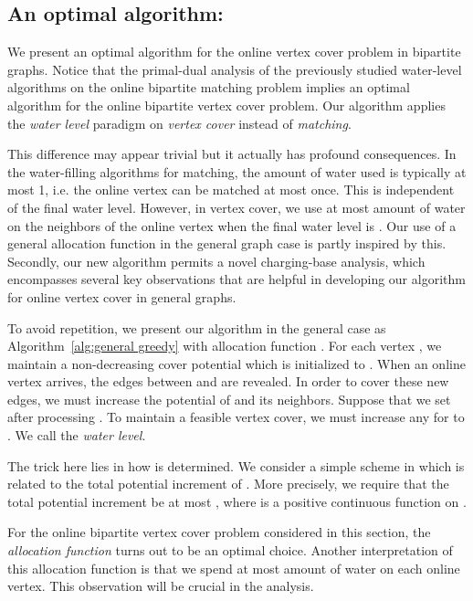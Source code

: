 \documentclass{article}
\begin{document}
\subsection{An optimal algorithm: }
\label{subsec:greedyallocation}
We present an optimal algorithm for the online vertex cover problem in bipartite graphs.  Notice that the primal-dual analysis of the previously studied water-level algorithms on the online bipartite matching problem implies an optimal algorithm for the online bipartite vertex cover problem. Our algorithm applies the {\em water level} paradigm on {\em vertex cover} instead of {\em matching}. 

This difference may appear trivial but it actually has profound consequences. In the water-filling algorithms for matching, the amount of water used is typically at most 1, i.e. the online vertex can be matched at most once. This is independent of the final water level. However, in vertex cover, we use at most  amount of water on the neighbors of the online vertex when the final water level is . Our use of a general allocation function  in the general graph case is partly inspired by this. Secondly, our new algorithm permits a novel charging-base analysis, 
which encompasses several key observations that are helpful in developing our algorithm for online vertex cover in general graphs.

To avoid repetition, we present our algorithm in the general case as Algorithm~\ref{alg:general greedy} with allocation function . For each vertex , we maintain a non-decreasing cover potential  which is initialized to .
When an online vertex  arrives, the edges between  and  are revealed. In order to cover these new edges, we must increase the potential of  and its neighbors. Suppose that we set  after processing . To maintain a feasible vertex cover, we must increase any  for  to . We call  the {\em water level}.

The trick here lies in how  is determined. We consider a simple scheme in which  is related to the total potential increment of . More precisely, we require that the total potential increment  be at most , where  is a positive continuous function on . 

For the online bipartite vertex cover problem considered in this section, the {\em allocation function}  turns out to be an optimal choice. Another interpretation of this allocation function is that we spend at most  amount of water on each online vertex. This observation will be crucial in the analysis. 
\end{document}
